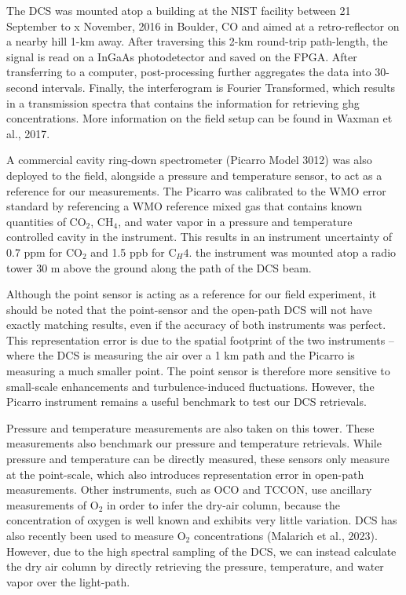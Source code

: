 \documentclass[amt, manuscript]{copernicus}
\begin{document}
The DCS was mounted atop a building at the NIST facility between 21 September to x November, 2016 in Boulder, CO and aimed at a retro-reflector on a nearby hill 1-km away. After traversing this 2-km round-trip path-length, the signal is read on a InGaAs photodetector and saved on the FPGA. After transferring to a computer, post-processing further aggregates the data into 30-second intervals. Finally, the interferogram is Fourier Transformed, which results in a transmission spectra that contains the information for retrieving ghg concentrations. More information on the field setup can be found in Waxman et al., 2017. 

A commercial cavity ring-down spectrometer (Picarro Model 3012) was also deployed to the field, alongside a pressure and temperature sensor, to act as a reference for our measurements. The Picarro was calibrated to the WMO error standard by referencing a WMO reference mixed gas that contains known quantities of CO$_2$, CH$_4$, and water vapor in a pressure and temperature controlled cavity in the instrument. This results in an instrument uncertainty of 0.7 ppm for CO$_2$ and 1.5 ppb for C$_H4$. the instrument was mounted atop a radio tower 30 m above the ground along the path of the DCS beam. 

Although the point sensor is acting as a reference for our field experiment, it should be noted that the point-sensor and the open-path DCS will not have exactly matching results, even if the accuracy of both instruments was perfect. This representation error is due to the spatial footprint of the two instruments – where the DCS is measuring the air over a 1 km path and the Picarro is measuring a much smaller point. The point sensor is therefore more sensitive to small-scale enhancements and turbulence-induced fluctuations. However, the Picarro instrument remains a useful benchmark to test our DCS retrievals.

Pressure and temperature measurements are also taken on this tower. These measurements  also benchmark our pressure and temperature retrievals. While pressure and temperature can be directly measured, these sensors only measure at the point-scale, which also introduces representation error in open-path measurements. Other instruments, such as OCO and TCCON, use ancillary measurements of O$_2$ in order to infer the dry-air column, because the concentration of oxygen is well known and exhibits very little variation. DCS has also recently been used to measure O$_2$ concentrations (Malarich et al., 2023). However, due to the high spectral sampling of the DCS, we can instead calculate the dry air column by directly retrieving the pressure, temperature, and water vapor over the light-path.  
\end{document}
